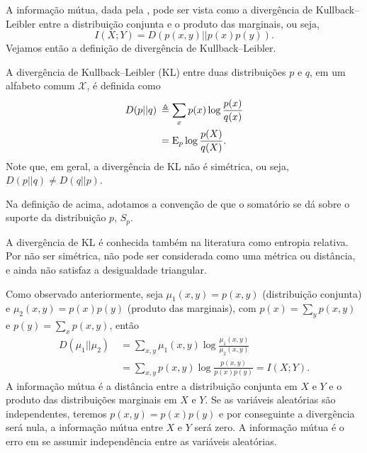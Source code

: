 A informação mútua, dada pela , pode ser vista como
a divergência de Kullback–Leibler entre a distribuição conjunta e o produto
das marginais, ou seja,
\begin{equation}
I(X;Y) = D(p(x,y)||p(x)p(y)) .
\end{equation}
Vejamos então a definição de divergência de Kullback–Leibler.
\begin{definition}\label{def:divKL}
A divergência de Kullback–Leibler (KL) entre duas distribuições $p$ e $q$, em um
alfabeto comum $\mathcal{X}$, é definida como
\begin{subequations}\label{eq:divergenciaKL}
\begin{align}
D(p||q) \: &\triangleq \sum_x p(x) \log \frac{p(x)}{q(x)} \\
        &= \mathrm{E}_p \log \frac{p(X)}{q(X)} .
\end{align}
\end{subequations}
Note que, em geral, a divergência de KL não é simétrica, ou seja, $D(p||q) \neq D(q||p)$.
\end{definition}
Na definição de acima, adotamos a convenção de que o somatório se dá
sobre o suporte da distribuição $p$, $S_p$. %

A divergência de KL é conhecida também na literatura como entropia relativa.
Por não ser simétrica, não pode ser considerada como uma métrica ou distância,
e ainda não satisfaz a desigualdade triangular.

Como observado anteriormente, seja $\mu_1(x,y) = p(x,y)$ (distribuição conjunta) e $\mu_2(x,y)=p(x)p(y)$ (produto das marginais),
com $p(x)=\sum_y p(x,y)$ e $p(y)=\sum_x p(x,y)$, então
\begin{subequations}\label{eq:divergenciaKLinfmut}
\begin{align}
 D(\mu_1 || \mu_2) \: &= \sum_{x,y} \mu_1(x,y) \log \frac{\mu_1(x,y)}{\mu_2(x,y)} \\
              &= \sum_{x,y} p(x,y) \log \frac{p(x,y)}{p(x)p(y)} = I(X;Y) .
\end{align}
\end{subequations}
A informação mútua é a distância entre a distribuição conjunta em $X$ e $Y$ e o
produto das distribuições marginais em $X$ e $Y$. Se as variáveis aleatórias
são independentes, teremos $p(x,y)=p(x)p(y)$ e por conseguinte a divergência
será nula, a informação mútua entre $X$ e $Y$ será zero. A informação mútua é
o erro em se assumir independência entre as variáveis aleatórias.

